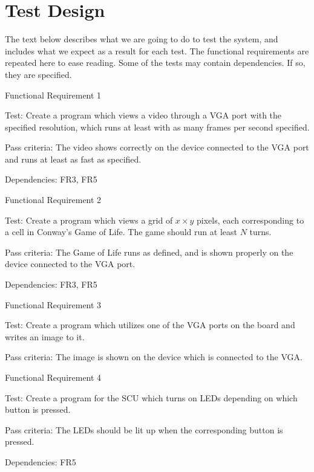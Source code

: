 \section{Test Design}

The text below describes what we are going to do to test the system, and
includes what we expect as a result for each test. The functional requirements
are repeated here to ease reading. Some of the tests may contain
dependencies\footnotemark. If so, they are specified.


{\sc Functional Requirement 1}
\begin{Test}
  {\em \FRI}

  {\sc Test:} Create a program which views a video through a \ac{VGA} port with
  the specified resolution, which runs at least with as many frames per second
  specified.

  {\sc Pass criteria:} The video shows correctly on the device connected to the
  \ac{VGA} port and runs at least as fast as specified.
  
  {\sc Dependencies:} FR3, FR5
\end{Test}

{\sc Functional Requirement 2}
\begin{Test}
  {\em \FRII}
  
  {\sc Test:} Create a program which views a grid of $x \times y$ pixels, each
  corresponding to a cell in Conway's Game of
  Life\cite{gardner1970mathematical}. The game should run at least $N$ turns.

  {\sc Pass criteria:} The Game of Life runs as defined, and is shown properly
  on the device connected to the \ac{VGA} port.

  {\sc Dependencies:} FR3, FR5
\end{Test}

{\sc Functional Requirement 3}
\begin{Test}
  {\em \FRIII}
  
  {\sc Test:} Create a program which utilizes one of the \ac{VGA} ports on the
  board and writes an image to it.

  {\sc Pass criteria:} The image is shown on the device which is connected to
  the \ac{VGA}.
\end{Test}

{\sc Functional Requirement 4}
\begin{Test}
  {\em \FRIV}
  
  {\sc Test:} Create a program for the \ac{SCU} which turns on \acp{LED}
  depending on which button is pressed.

  {\sc Pass criteria:} The \acp{LED} should be lit up when the corresponding
  button is pressed.

  {\sc Dependencies:} FR5
\end{Test}

